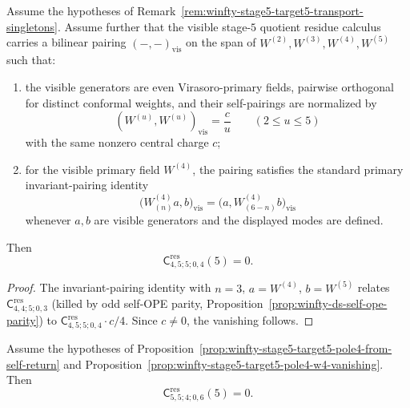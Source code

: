 \begin{proposition}
\label{prop:winfty-stage5-target5-pole4-w4-vanishing}
Assume the hypotheses of
Remark~\ref{rem:winfty-stage5-target5-transport-singletons}.
Assume further that the visible stage-$5$ quotient residue calculus
carries a bilinear pairing \((-, -)_{\mathrm{vis}}\) on the span of
\(W^{(2)},W^{(3)},W^{(4)},W^{(5)}\) such that:
\begin{enumerate}[label=\textup{(\roman*)}]
\item the visible generators are even Virasoro-primary fields,
 pairwise orthogonal for distinct conformal weights, and their
 self-pairings are normalized by
 \[
 (W^{(u)},W^{(u)})_{\mathrm{vis}}=\frac{c}{u}
 \qquad (2\le u\le 5)
 \]
 with the same nonzero central charge \(c\);
\item for the visible primary field \(W^{(4)}\), the pairing satisfies
 the standard primary invariant-pairing identity
 \[
 \bigl(W^{(4)}_{(n)}a,b\bigr)_{\mathrm{vis}}
 =
 \bigl(a,W^{(4)}_{(6-n)}b\bigr)_{\mathrm{vis}}
 \]
 whenever \(a,b\) are visible generators and the displayed modes are
 defined.
\end{enumerate}
Then
\[
\mathsf{C}^{\mathrm{res}}_{4,5;5;0,4}(5)=0.
\]
\end{proposition}

\begin{proof}
The invariant-pairing identity with \(n=3\), \(a=W^{(4)}\), \(b=W^{(5)}\) relates \(\mathsf{C}^{\mathrm{res}}_{4,4;5;0,3}\) (killed by odd self-OPE parity, Proposition~\ref{prop:winfty-ds-self-ope-parity}) to \(\mathsf{C}^{\mathrm{res}}_{4,5;5;0,4}\cdot c/4\). Since \(c\neq 0\), the vanishing follows.
\end{proof}

\begin{corollary}
\label{cor:winfty-stage5-self-return-vanishing-on-pairing}
Assume the hypotheses of
Proposition~\ref{prop:winfty-stage5-target5-pole4-from-self-return}
and Proposition~\ref{prop:winfty-stage5-target5-pole4-w4-vanishing}.
Then
\[
\mathsf{C}^{\mathrm{res}}_{5,5;4;0,6}(5)=0.
\]
\end{corollary}

